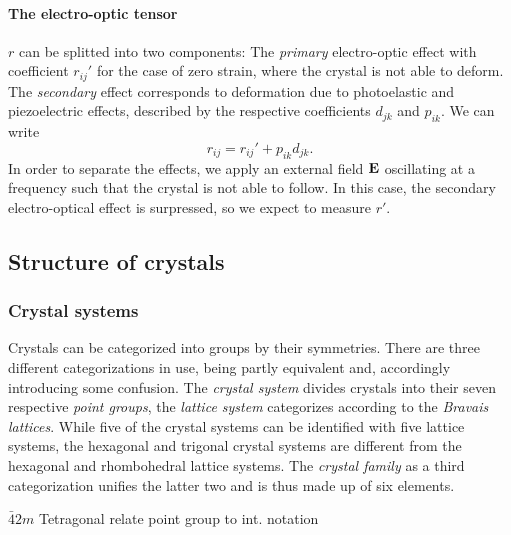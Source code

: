 \paragraph{The electro-optic tensor}
$r$ can be splitted into two components:
The \emph{primary} electro-optic effect with coefficient $r_{ij}'$
for the case of zero strain, where the crystal is 
not able to deform. The \emph{secondary} effect corresponds to deformation 
due to photoelastic and piezoelectric effects, described by the 
respective coefficients $d_{jk}$ and $p_{ik}$.
We can write
\begin{equation}
    r_{ij} = r_{ij}' + p_{ik} d_{jk}.
\end{equation}
In order to separate the effects, we apply an external field $\mathbf{E}$ 
oscillating at a frequency such that the crystal is not able 
to follow. In this case, the secondary electro-optical effect is surpressed, 
so we expect to measure $r'$. 

\subsection{Structure of crystals}
\subsubsection{Crystal systems}
Crystals can be categorized into groups by their symmetries. 
There are three different categorizations in use, being 
partly equivalent and, accordingly introducing some confusion. 
The \emph{crystal system} divides crystals into their seven 
respective \emph{point groups}, the \emph{lattice system} 
categorizes according to the \emph{Bravais lattices}. While 
five of the crystal systems can be identified with five 
lattice systems, the hexagonal and trigonal crystal systems 
are different from the hexagonal and rhombohedral lattice systems. 
The \emph{crystal family} as a third categorization unifies 
the latter two and is thus made up of six elements. 


$\bar{4}2m$ Tetragonal
relate point group to int. notation


